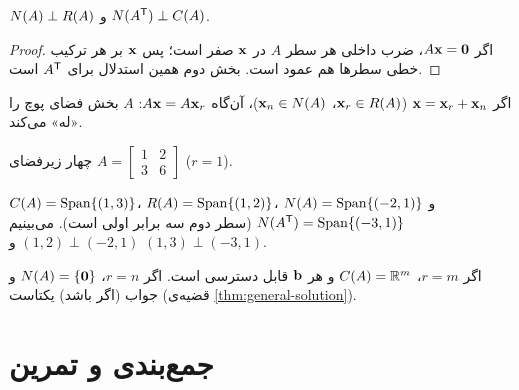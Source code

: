 \begin{theorem}[تعامد]\label{thm:orthogonal-subspaces}
$N(A)\perp R(A)$ و $N(A^{\mathsf{T}})\perp C(A)$.
\end{theorem}
\begin{proof}
اگر $A\mathbf{x}=\mathbf{0}$، ضرب داخلی  هر سطر $A$ در $\mathbf{x}$ صفر است؛ پس $\mathbf{x}$ بر هر ترکیب خطی سطرها هم عمود است. بخش دوم همین استدلال برای $A^{\mathsf{T}}$ است.
\end{proof}

\begin{intuition}
اگر $\mathbf{x}=\mathbf{x}_r+\mathbf{x}_n$ ($\mathbf{x}_r\in R(A)$، $\mathbf{x}_n\in N(A)$)، آن‌گاه $A\mathbf{x}=A\mathbf{x}_r$: $A$ بخش فضای پوچ را «له» می‌کند.
\end{intuition}

\begin{example}
چهار زیرفضای $A=\begin{bmatrix}1&2\\3&6\end{bmatrix}$ ($r=1$).
\end{example}
\begin{solution}
$C(A)=\operatorname{Span}\{(1,3)\}$، $R(A)=\operatorname{Span}\{(1,2)\}$، $N(A)=\operatorname{Span}\{(-2,1)\}$ و $N(A^{\mathsf{T}})=\operatorname{Span}\{(-3,1)\}$ (سطر دوم سه برابر اولی است). می‌بینیم $(1,2)\perp(-2,1)$ و $(1,3)\perp(-3,1)$.
\end{solution}

\begin{center}
\renewcommand{\arraystretch}{1.5}
\end{center}
اگر $r=m$، $C(A)=\mathbb{R}^m$ و هر $\mathbf{b}$ قابل دسترسی است. اگر $r=n$، $N(A)=\{\mathbf{0}\}$ و جواب (اگر باشد) یکتاست (قضیه‌ی \ref{thm:general-solution}).

\section{جمع‌بندی و تمرین}

